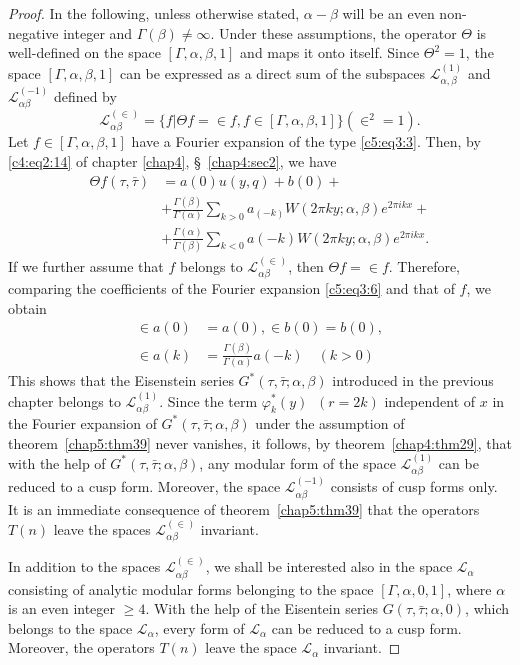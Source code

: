 \begin{proof}
In the following, unless otherwise stated, $\alpha-\beta$ will be an
even non-negative integer and $\Gamma(\beta)\neq\infty$. Under these
assumptions, the operator $\Theta$ is well-defined on the space
$[\Gamma,\alpha, \beta,1]$ and maps it onto itself. Since
$\Theta^2=1$, the space $[\Gamma, \alpha, \beta,1]$ can be expressed
as a direct sum of the subspaces $\mathscr{L}^{(1)}_{\alpha,\beta}$
and $\mathscr{L}^{(-1)}_{\alpha\beta}$ defined by
$$
\mathscr{L}^{(\in )}_{\alpha\beta} = \{f|\Theta f =\in
f, f \in [\Gamma, \alpha,\beta,1]\} (\in^2=1).
$$
Let $f\in [\Gamma, \alpha,\beta, 1]$ have a Fourier expansion
of the type \eqref{c5:eq3:3}. Then, by 
\eqref{c4:eq2:14} of chapter \pageoriginale \ref{chap4}, 
\S~\ref{chap4:sec2}, we have
\begin{align*}
\Theta f(\tau,\bar{\tau}) & = a(0) u (y,q) + b(0) +\\
& + \frac{\Gamma(\beta)}{\Gamma(\alpha)} \sum_{k>0} a_{(-k)} W(2\pi k
y ;\alpha, \beta) e^{2\pi i k x} +\\
& +  \frac{\Gamma(\alpha)}{\Gamma(\beta)} \sum_{k<0} a (-k) W(2\pi k y
;\alpha,\beta) e^{2\pi i k x}. \tag{6}\label{c5:eq3:6}
\end{align*}
If we further assume that $f$ belongs to
$\mathscr{L}^{(\in)}_{\alpha\beta}$, then $\Theta f=\in
f$. Therefore, comparing the coefficients of the Fourier expansion \eqref{c5:eq3:6}
and that of $f$, we obtain 
\begin{align*}
\in a(0) & = a(0), \in b(0) =b(0),\\
\in a(k) & = \frac{\Gamma(\beta)}{\Gamma(\alpha)} a(-k) \quad
(k>0) \tag{7}\label{c5:eq3:7}
\end{align*}
This shows that the Eisenstein series
$G^{\ast}(\tau,\bar{\tau};\alpha,\beta)$ introduced in the previous
chapter belongs to $\mathscr{L}^{(1)}_{\alpha\beta}$. Since the term
$\varphi^{\ast}_k (y) \;\; (r=2k)$ independent of $x$ in the Fourier
expansion of $G^{\ast}(\tau,\bar{\tau};\alpha,\beta)$ under the
assumption of theorem~\ref{chap5:thm39} never vanishes, it follows, 
by theorem~\ref{chap4:thm29}, that with the help of $G^{\ast}
(\tau,\bar{\tau};\alpha,\beta)$, any
modular form of the space $\mathscr{L}^{(1)}_{\alpha\beta}$ can be
reduced to a cusp form. Moreover, the space
$\mathscr{L}^{(-1)}_{\alpha\beta}$ consists of cusp forms only. It is
an immediate consequence of theorem~\ref{chap5:thm39} that the 
operators $T(n)$ leave 
the spaces $\mathscr{L}^{(\in)}_{\alpha\beta}$ invariant.

In addition to the spaces $\mathscr{L}^{(\in)}_{\alpha\beta}$,
we shall be interested also in the space $\mathscr{L}_{\alpha}$
consisting of analytic modular forms belonging to the space $[\Gamma,
  \alpha, 0, 1]$, where $\alpha$ is an even integer $\geq 4$. With the
help of the Eisentein series $G(\tau,\bar{\tau};\alpha,0)$, which
belongs to the space $\mathscr{L}_{\alpha}$, every form of
$\mathscr{L}_{\alpha}$ can be reduced to a cusp form. Moreover, the
operators $T(n)$ leave \pageoriginale the space $\mathscr{L}_{\alpha}$
invariant.


\end{proof}
